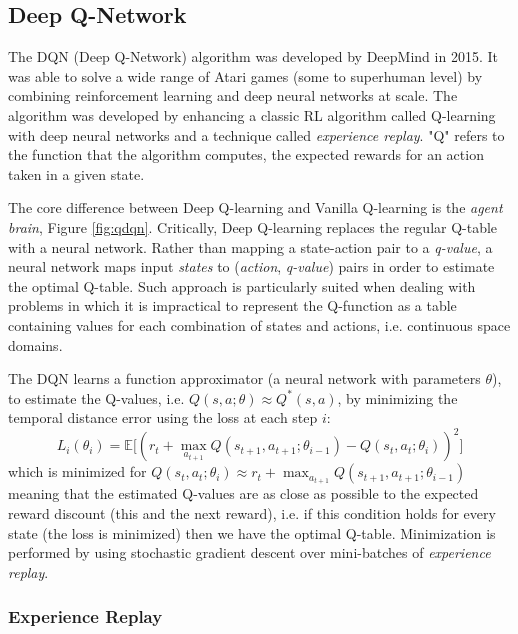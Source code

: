 \documentclass{article}
\begin{document}
\subsection{Deep Q-Network}\label{sec:dqn} %

The DQN (Deep Q-Network) algorithm was developed by DeepMind \cite{Mnih2015HumanlevelCT} in 2015. It was able to solve a wide range of Atari games (some to superhuman level) by combining reinforcement learning and deep neural networks at scale. The algorithm was developed by enhancing a classic RL algorithm called Q-learning with deep neural networks and a technique called \textit{experience replay}. "Q" refers to the function that the algorithm computes, the expected rewards for an action taken in a given state.

The core difference between Deep Q-learning and Vanilla Q-learning is the \textit{agent brain}, Figure \ref{fig:qdqn}. Critically, Deep Q-learning replaces the regular Q-table with a neural network. Rather than mapping a state-action pair to a \textit{q-value}, a neural network maps input \textit{states} to (\textit{action}, \textit{q-value}) pairs in order to estimate the optimal Q-table. Such approach is particularly suited when dealing with problems in which it is impractical to represent the Q-function as a table containing values for each combination of states and actions, i.e. continuous space domains. 

The DQN learns a function approximator (a neural network with parameters $\theta$), to estimate the Q-values, i.e. 
$Q(s,a;\theta)\approx Q^*(s,a)$, by minimizing the temporal distance error using the loss at each step $i$:
\begin{equation}
    L_i(\theta_i)=\mathbb{E}\big[(r_t+\max_{a_{t+1}} Q(s_{t+1},a_{t+1};\theta_{i-1})-Q(s_{t},a_{t};\theta_{i}))^2\big]
\end{equation}
which is minimized for $Q(s_{t},a_{t};\theta_{i})\approx r_t+\max_{a_{t+1}} Q(s_{t+1},a_{t+1};\theta_{i-1})$ meaning that the estimated Q-values are as close as possible to the expected reward discount (this and the next reward), i.e. if this condition holds for every state (the loss is minimized) then we have the optimal Q-table. Minimization is performed by using stochastic gradient descent over mini-batches of \textit{experience replay}.

\subsubsection{Experience Replay}\label{sec:exrep}%
\end{document}
